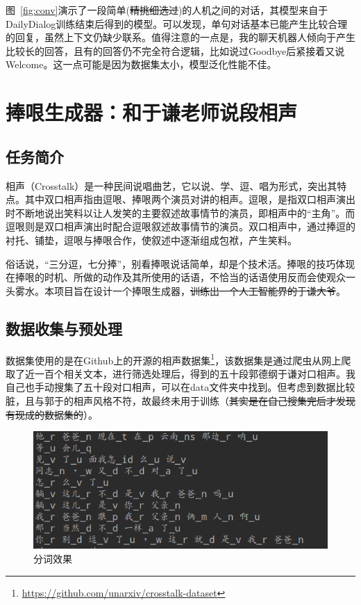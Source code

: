 \documentclass[12pt]{article} %
\begin{document}
\begin{sloppypar}
图~\ref{fig:conv}演示了一段简单(\sout{精挑细选过})的人机之间的对话，其模型来自于DailyDialog训练结束后得到的模型。可以发现，单句对话基本已能产生比较合理的回复，虽然上下文仍缺少联系。值得注意的一点是，我的聊天机器人倾向于产生比较长的回答，且有的回答仍不完全符合逻辑，比如说过Goodbye后紧接着又说Welcome。这一点可能是因为数据集太小，模型泛化性能不佳。

\section{捧哏生成器：和于谦老师说段相声}

\subsection{任务简介}

相声（Crosstalk）是一种民间说唱曲艺，它以说、学、逗、唱为形式，突出其特点。其中双口相声指由逗哏、捧哏两个演员对讲的相声。逗哏，是指双口相声演出时不断地说出笑料以让人发笑的主要叙述故事情节的演员，即相声中的“主角”。而逗哏则是双口相声演出时配合逗哏叙述故事情节的演员。双口相声中，通过捧逗的衬托、铺垫，逗哏与捧哏合作，使叙述中逐渐组成包袱，产生笑料。

俗话说，“三分逗，七分捧”，别看捧哏说话简单，却是个技术活。捧哏的技巧体现在捧哏的时机、所做的动作及其所使用的话语，不恰当的话语使用反而会使观众一头雾水。本项目旨在设计一个捧哏生成器，\sout{训练出一个人工智能界的于谦大爷}。

\subsection{数据收集与预处理}

数据集使用的是在Github上的开源的相声数据集\footnote{\url{https://github.com/unarxiv/crosstalk-dataset}}，该数据集是通过爬虫从网上爬取了近一百个相关文本，进行筛选处理后，得到的五十段郭德纲于谦对口相声。我自己也手动搜集了五十段对口相声，可以在data文件夹中找到。但考虑到数据比较脏，且与郭于的相声风格不符，故最终未用于训练（\sout{其实是在自己搜集完后才发现有现成的数据集的}）。


\begin{figure}[h]
	\centering
	\includegraphics[width=0.9\linewidth]{figure/seg.png}
	\caption{分词效果}
	\label{fig:seg}
\end{figure}


\end{sloppypar}
\end{document}
